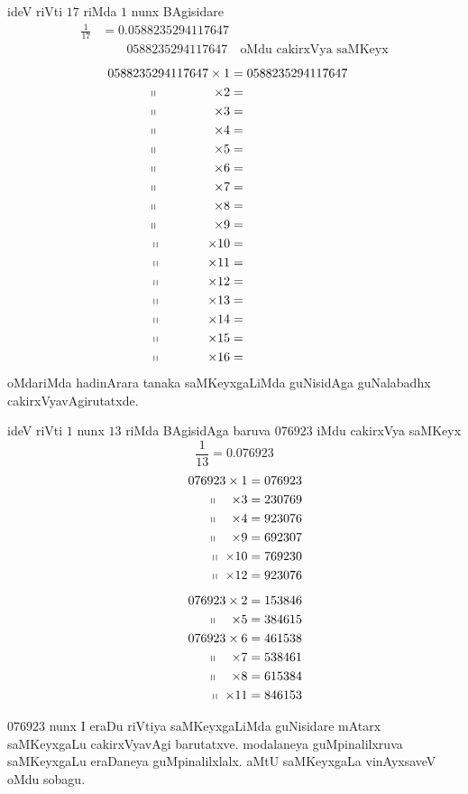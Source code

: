 ideV riVti $17$ riMda $1$ nunx BAgisidare
\begin{align*}
\frac{1}{17} &= 0.0588235294117647\\
&\qquad 0588235294117647 \quad\text{oMdu cakirxVya saMKeyx}
\end{align*}
\begin{align*}
0588235294117647 \times 1 &= 0588235294117647\\
~~~~~~\shortparallel ~~~~~~~~~~~~~ \times 2 &= &\\
~~~~~~\shortparallel ~~~~~~~~~~~~~\times 3 &= \\
~~~~~~\shortparallel ~~~~~~~~~~~~~\times 4 &= \\
~~~~~~\shortparallel ~~~~~~~~~~~~~\times 5 &= \\
~~~~~~\shortparallel ~~~~~~~~~~~~~\times 6 &= \\
~~~~~~\shortparallel ~~~~~~~~~~~~~\times 7 &= \\
~~~~~~\shortparallel ~~~~~~~~~~~~~\times 8 &= \\
~~~~~~\shortparallel ~~~~~~~~~~~~~\times 9 &= \\
~~~~~~\shortparallel ~~~~~~~~~~~\times 10 &= \\
~~~~~~\shortparallel ~~~~~~~~~~~\times 11 &= \\
~~~~~~\shortparallel ~~~~~~~~~~~\times  12&= \\
~~~~~~\shortparallel ~~~~~~~~~~~\times  13&= \\
~~~~~~\shortparallel ~~~~~~~~~~~\times  14&= \\
~~~~~~\shortparallel ~~~~~~~~~~~\times  15&= \\
~~~~~~\shortparallel ~~~~~~~~~~~\times  16&= 
\end{align*}
oMdariMda hadinArara tanaka saMKeyxgaLiMda guNisidAga guNalabadhx cakirxVyavAgirutatxde.

ideV riVti $1$ nunx $13$ riMda BAgisidAga baruva $076923$ iMdu cakirxVya saMKeyx
$$
\frac{1}{13} = 0.076923
$$
\begin{align*}
076923 \times 1 &= 076923 \\
~~~~~~~~~\shortparallel ~~~\times 3 &= 230769 \\ 
~~~~~~~~~\shortparallel ~~~\times 4 &= 923076 \\
~~~~~~~~~\shortparallel ~~~\times 9 &= 692307 \\ 
~~~~~~~~~~~\shortparallel ~\times 10 &= 769230 \\
~~~~~~~~~~~\shortparallel ~\times 12 &= 923076\\[5pt] 
076923 \times 2 &= 153846 \\
~~~~~~~~~\shortparallel ~~~\times 5 &= 384615 \\
076923   \times 6 &= 461538 \\
~~~~~~~~~\shortparallel ~~~\times 7 &= 538461 \\
~~~~~~~~~\shortparallel ~~~\times 8 &= 615384 \\
~~~~~~~~~~~\shortparallel ~\times 11 &= 846153 
\end{align*}

$076923$ nunx  I eraDu riVtiya saMKeyxgaLiMda guNisidare mAtarx saMKeyxgaLu cakirxVyavAgi barutatxve. modalaneya guMpinalilxruva saMKeyxgaLu eraDaneya guMpinalilxlalx. aMtU saMKeyxgaLa vinAyxsaveV oMdu sobagu.
